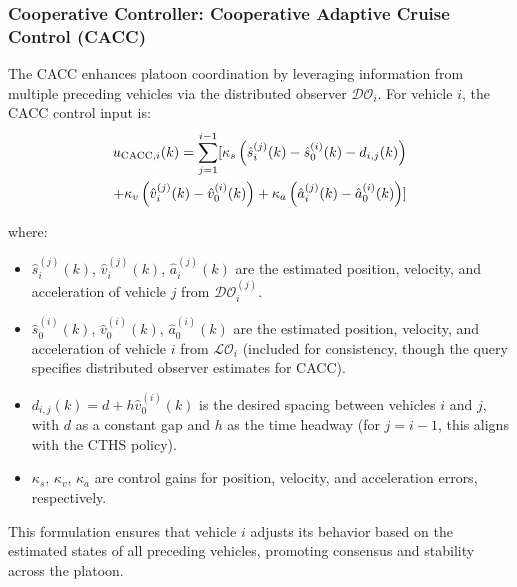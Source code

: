 \documentclass[letterpaper, 10pt, conference]{ieeeconf}  %
\def\LO{\mathcal{LO}} %
\def\DO{\mathcal{DO}} %
\begin{document}
\subsubsection{Cooperative Controller: Cooperative Adaptive Cruise Control (CACC)}
The CACC enhances platoon coordination by leveraging information from multiple preceding vehicles via the distributed observer $\DO_{i}$. For vehicle $i$, the CACC control input is:
\begin{align}
    u_{\text{CACC},i}(k) = \sum_{j=1}^{i-1} [ \kappa_s \left( \hat{s}_i^{(j)}(k) - \hat{s}_0^{(i)}(k) - d_{i,j}(k) \right) \\ \notag +  \kappa_v \left( \hat{v}_i^{(j)}(k) -  \hat{v}_0^{(i)}(k) \right) + \kappa_a \left( \hat{a}_i^{(j)}(k) - \hat{a}_0^{(i)}(k) \right)]
\end{align}

where:
\begin{itemize}
    \item $\hat{s}_i^{(j)}(k)$, $\hat{v}_i^{(j)}(k)$, $\hat{a}_i^{(j)}(k)$ are the estimated position, velocity, and acceleration of vehicle $j$ from $\DO_i^{(j)}$.
    \item $\hat{s}_0^{(i)}(k)$, $\hat{v}_0^{(i)}(k)$, $\hat{a}_0^{(i)}(k)$ are the estimated position, velocity, and acceleration of vehicle $i$ from $\LO_i$ (included for consistency, though the query specifies distributed observer estimates for CACC).
    \item $d_{i,j}(k) = d + h \hat{v}_0^{(i)}(k)$ is the desired spacing between vehicles $i$ and $j$, with $d$ as a constant gap and $h$ as the time headway (for $j = i-1$, this aligns with the CTHS policy).
    \item $\kappa_s$, $\kappa_v$, $\kappa_a$ are control gains for position, velocity, and acceleration errors, respectively.
\end{itemize}
This formulation ensures that vehicle $i$ adjusts its behavior based on the estimated states of all preceding vehicles, promoting consensus and stability across the platoon.

\end{document}
